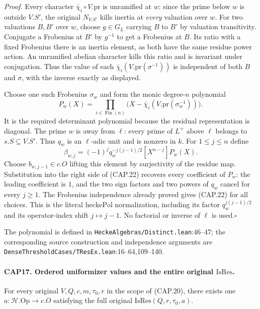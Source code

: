 \emph{Proof.}
Every character $\bar\chi_i\circ V.\mathrm{pr}$ is unramified at
$w$: since the prime below $w$ is outside $V.S'$, the original
$N_{V.S'}$ kills inertia at \emph{every} valuation over $w$.
For two valuations $B,B'$ over $w$, choose $g\in G_L$ carrying
$B$ to $B'$ by valuation transitivity.  Conjugate a Frobenius at
$B'$ by $g^{-1}$ to get a Frobenius at $B$.  Its ratio with a fixed
Frobenius there is an inertia element, as both have the same residue
power action.  An unramified abelian character kills this ratio and
is invariant under conjugation.  Thus the value of each
$\bar\chi_i(V.\mathrm{pr}(\sigma^{-1}))$ is independent of both
$B$ and $\sigma$, with the inverse exactly as displayed.

Choose one such Frobenius $\sigma_w$ and form the monic degree-$n$
polynomial
\[
 P_w(X)=\prod_{i\in\operatorname{Fin}(n)}
     \bigl(X-\bar\chi_i(V.\mathrm{pr}(\sigma_w^{-1}))\bigr).
\]
It is the required determinant polynomial because the residual
representation is diagonal.  The prime $w$ is away from $\ell$:
every prime of $L^+$ above $\ell$ belongs to $s.S\subseteq V.S'$.
Thus $q_w$ is an $\ell$-adic unit and is nonzero in $k$.
For $1\leq j\leq n$ define
\[
 \beta_{w,j}=(-1)^j q_w^{-j(j-1)/2}
                         [X^{n-j}]P_w(X).
 \tag{CAP.23}
\]
Choose $b_{w,j-1}\in c.O$ lifting this element by surjectivity of
the residue map.  Substitution into the right side of (CAP.22)
recovers every coefficient of $P_w$: the leading coefficient is $1$,
and the two sign factors and two powers of $q_w$ cancel for every
$j\geq1$.  The Frobenius independence already proved gives (CAP.22)
for all choices.  This is the literal $\mathrm{heckePol}$
normalization, including its factor $q_w^{j(j-1)/2}$ and its
operator-index shift $j\mapsto j-1$.  No factorial or inverse of
$\ell$ is used.\hfill$\square$

The polynomial is defined in \nolinkurl{HeckeAlgebras/Distinct.lean}:46--47;
the corresponding source construction and independence arguments are
\nolinkurl{DenseThresholdCases/TResEx.lean}:16--64,109--140.

\paragraph{CAP17. Ordered uniformizer values and the entire original $\mathrm{IsRes}$.}
\label{claim:CAP17}
For every original $V,Q,c,m,\tau_0,r$ in the scope of (CAP.20), there
exists one $a:\mathcal H.\mathrm{Op}\to c.O$ satisfying the full
original $\mathrm{IsRes}(Q,r,\tau_0,a)$.

